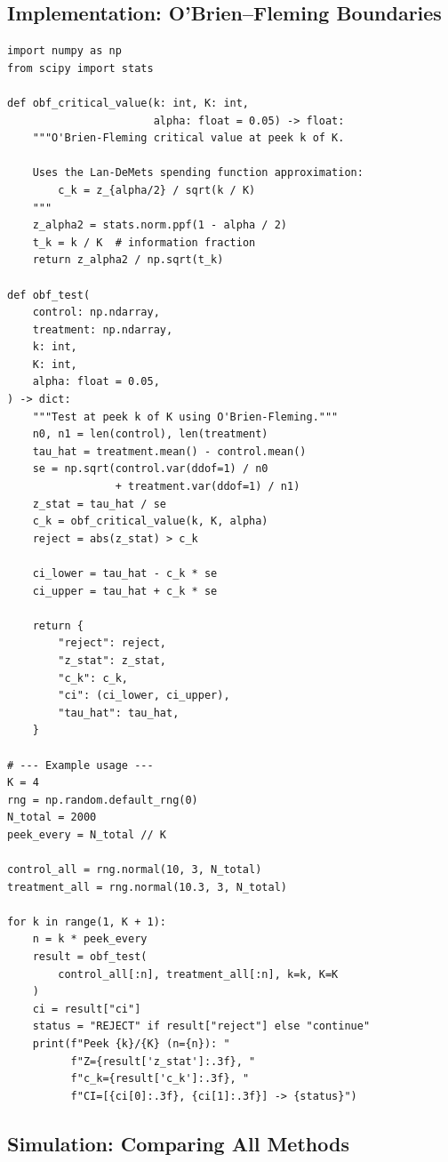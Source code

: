 \documentclass[12pt, a4paper]{article}
\begin{document}
\subsection{Implementation: O'Brien--Fleming Boundaries}

\begin{lstlisting}
import numpy as np
from scipy import stats

def obf_critical_value(k: int, K: int,
                       alpha: float = 0.05) -> float:
    """O'Brien-Fleming critical value at peek k of K.

    Uses the Lan-DeMets spending function approximation:
        c_k = z_{alpha/2} / sqrt(k / K)
    """
    z_alpha2 = stats.norm.ppf(1 - alpha / 2)
    t_k = k / K  # information fraction
    return z_alpha2 / np.sqrt(t_k)

def obf_test(
    control: np.ndarray,
    treatment: np.ndarray,
    k: int,
    K: int,
    alpha: float = 0.05,
) -> dict:
    """Test at peek k of K using O'Brien-Fleming."""
    n0, n1 = len(control), len(treatment)
    tau_hat = treatment.mean() - control.mean()
    se = np.sqrt(control.var(ddof=1) / n0
                 + treatment.var(ddof=1) / n1)
    z_stat = tau_hat / se
    c_k = obf_critical_value(k, K, alpha)
    reject = abs(z_stat) > c_k

    ci_lower = tau_hat - c_k * se
    ci_upper = tau_hat + c_k * se

    return {
        "reject": reject,
        "z_stat": z_stat,
        "c_k": c_k,
        "ci": (ci_lower, ci_upper),
        "tau_hat": tau_hat,
    }

# --- Example usage ---
K = 4
rng = np.random.default_rng(0)
N_total = 2000
peek_every = N_total // K

control_all = rng.normal(10, 3, N_total)
treatment_all = rng.normal(10.3, 3, N_total)

for k in range(1, K + 1):
    n = k * peek_every
    result = obf_test(
        control_all[:n], treatment_all[:n], k=k, K=K
    )
    ci = result["ci"]
    status = "REJECT" if result["reject"] else "continue"
    print(f"Peek {k}/{K} (n={n}): "
          f"Z={result['z_stat']:.3f}, "
          f"c_k={result['c_k']:.3f}, "
          f"CI=[{ci[0]:.3f}, {ci[1]:.3f}] -> {status}")
\end{lstlisting}


\subsection{Simulation: Comparing All Methods}
\end{document}
